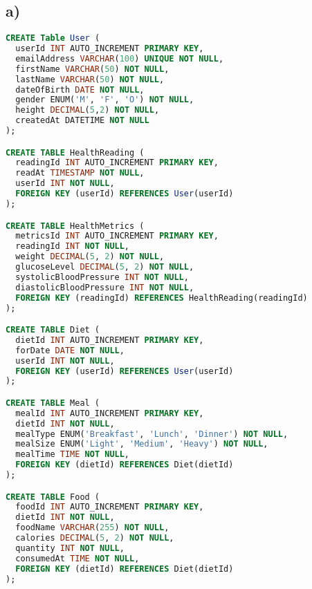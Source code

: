 \documentclass{article}
\begin{document}
\subsection*{\small a)}
\vspace{-0.25cm}
\begin{lstlisting}[language=sql]
CREATE Table User (
  userId INT AUTO_INCREMENT PRIMARY KEY,
  emailAddress VARCHAR(100) UNIQUE NOT NULL,
  firstName VARCHAR(50) NOT NULL,
  lastName VARCHAR(50) NOT NULL,
  dateOfBirth DATE NOT NULL,
  gender ENUM('M', 'F', 'O') NOT NULL,
  height DECIMAL(5,2) NOT NULL,
  createdAt DATETIME NOT NULL
);

CREATE TABLE HealthReading (
  readingId INT AUTO_INCREMENT PRIMARY KEY,
  readAt TIMESTAMP NOT NULL,
  userId INT NOT NULL,
  FOREIGN KEY (userId) REFERENCES User(userId)
);

CREATE TABLE HealthMetrics (
  metricsId INT AUTO_INCREMENT PRIMARY KEY,
  readingId INT NOT NULL,
  weight DECIMAL(5, 2) NOT NULL,
  glucoseLevel DECIMAL(5, 2) NOT NULL,
  systolicBloodPressure INT NOT NULL,
  diastolicBloodPressure INT NOT NULL,
  FOREIGN KEY (readingId) REFERENCES HealthReading(readingId)
);

CREATE TABLE Diet (
  dietId INT AUTO_INCREMENT PRIMARY KEY,
  forDate DATE NOT NULL,
  userId INT NOT NULL,
  FOREIGN KEY (userId) REFERENCES User(userId)
);

CREATE TABLE Meal (
  mealId INT AUTO_INCREMENT PRIMARY KEY,
  dietId INT NOT NULL,
  mealType ENUM('Breakfast', 'Lunch', 'Dinner') NOT NULL,
  mealSize ENUM('Light', 'Medium', 'Heavy') NOT NULL,
  mealTime TIME NOT NULL,
  FOREIGN KEY (dietId) REFERENCES Diet(dietId)
);

CREATE TABLE Food (
  foodId INT AUTO_INCREMENT PRIMARY KEY,
  dietId INT NOT NULL,
  foodName VARCHAR(255) NOT NULL,
  calories DECIMAL(5, 2) NOT NULL,
  quantity INT NOT NULL,
  consumedAt TIME NOT NULL,
  FOREIGN KEY (dietId) REFERENCES Diet(dietId)
);
\end{lstlisting}
\end{document}
